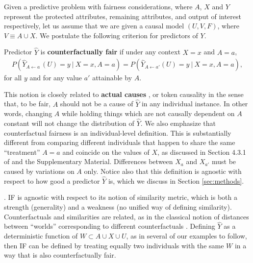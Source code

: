 Given a predictive problem with fairness considerations, where $A$, $X$ and $Y$
represent the protected attributes, remaining attributes, and output of interest respectively,
let us assume that we are given a causal model $(U, V, F)$, where $V \equiv A \cup X$.
We postulate the following criterion for predictors of $Y$.
\begin{define}
Predictor $\hat Y$ is {\bf counterfactually fair}
if under any context $X = x$ and $A = a$,
  \label{eq:cf_definition}
\begin{align}
  P(\hat Y_{A \leftarrow a\ }(U) = y\ |\ X = x, A = a)  =%
  P(\hat Y_{A \leftarrow a'}(U) = y\ |\ X = x, A = a), 
\end{align}
for all $y$ and for any value $a'$ attainable by $A$.
\end{define}

This notion is closely related to {\bf actual causes}
\cite{halpern:16}, or token causality in the sense that, to be fair,
$A$ should not be a cause of $\hat Y$ in any individual instance. In
other words, changing $A$ while holding things which are not causally
dependent on $A$ constant will not change the distribution of $\hat
Y$.
We also emphasize that
counterfactual fairness is an individual-level definition. This is
substantially different from comparing different individuals that happen to
share the same ``treatment'' $A = a$ and coincide on the values of
$X$, as discussed in Section 4.3.1 of \citep{pearl:16} and the
Supplementary Material. Differences between $X_a$ and $X_{a'}$ must be caused
by variations on $A$ only. Notice also that this definition is
agnostic with respect to how good a predictor $\hat Y$ is, which we
discuss in Section \ref{sec:methods}.

. IF is agnostic with
respect to its notion of similarity metric, which is both a strength
(generality) and a weakness (no unified way of defining similarity).
Counterfactuals and similarities are related, as in the classical
notion of distances between ``worlds'' corresponding to different
counterfactuals \cite{lewis:73}. Defining $\hat Y$ as a
deterministic function of $W \subset A \cup X \cup U$, as in several
of our examples to follow, then IF can be defined by treating equally two
individuals with the same $W$ in a way that is also counterfactually fair.


